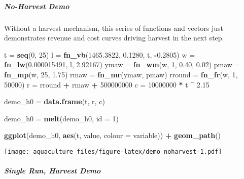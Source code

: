 \documentclass[]{article}
\newenvironment{Shaded}{\begin{snugshade}}{\end{snugshade}}
\newcommand{\KeywordTok}[1]{\textcolor[rgb]{0.13,0.29,0.53}{\textbf{#1}}}
\newcommand{\DataTypeTok}[1]{\textcolor[rgb]{0.13,0.29,0.53}{#1}}
\newcommand{\DecValTok}[1]{\textcolor[rgb]{0.00,0.00,0.81}{#1}}
\newcommand{\FloatTok}[1]{\textcolor[rgb]{0.00,0.00,0.81}{#1}}
\newcommand{\StringTok}[1]{\textcolor[rgb]{0.31,0.60,0.02}{#1}}
\newcommand{\OperatorTok}[1]{\textcolor[rgb]{0.81,0.36,0.00}{\textbf{#1}}}
\newcommand{\NormalTok}[1]{#1}
\let\oldsubparagraph\subparagraph
\renewcommand{\subparagraph}[1]{\oldsubparagraph{#1}\mbox{}}
\begin{document}
\subparagraph{No-Harvest Demo}\label{no-harvest-demo}

Without a harvest mechanism, this series of functions and vectors just
demonstrates revenue and cost curves driving harvest in the next step.

\begin{Shaded}
\begin{Highlighting}[]
\NormalTok{t =}\StringTok{ }\KeywordTok{seq}\NormalTok{(}\DecValTok{0}\NormalTok{, }\DecValTok{25}\NormalTok{)}
\NormalTok{l =}\StringTok{ }\KeywordTok{fn_vb}\NormalTok{(}\FloatTok{1465.3822}\NormalTok{, }\FloatTok{0.1280}\NormalTok{, t, }\OperatorTok{-}\FloatTok{0.2805}\NormalTok{)}
\NormalTok{w =}\StringTok{ }\KeywordTok{fn_lw}\NormalTok{(}\FloatTok{0.000015491}\NormalTok{, l, }\FloatTok{2.92167}\NormalTok{)}
\NormalTok{ymaw =}\StringTok{ }\KeywordTok{fn_wm}\NormalTok{(w, }\DecValTok{1}\NormalTok{, }\FloatTok{0.40}\NormalTok{, }\FloatTok{0.02}\NormalTok{)}
\NormalTok{pmaw =}\StringTok{ }\KeywordTok{fn_mp}\NormalTok{(w, }\DecValTok{25}\NormalTok{, }\FloatTok{1.75}\NormalTok{)}
\NormalTok{rmaw =}\StringTok{ }\KeywordTok{fn_mr}\NormalTok{(ymaw, pmaw)}
\NormalTok{rround =}\StringTok{ }\KeywordTok{fn_fr}\NormalTok{(w, }\DecValTok{1}\NormalTok{, }\DecValTok{50000}\NormalTok{)}
\NormalTok{r =}\StringTok{ }\NormalTok{rround }\OperatorTok{+}\StringTok{ }\NormalTok{rmaw }\OperatorTok{+}\StringTok{ }\DecValTok{500000000}
\NormalTok{c =}\StringTok{  }\DecValTok{10000000} \OperatorTok{*}\StringTok{ }\NormalTok{t }\OperatorTok{^}\StringTok{ }\FloatTok{2.15}

\NormalTok{demo_h0 =}\StringTok{ }\KeywordTok{data.frame}\NormalTok{(t, r, c)}

\NormalTok{demo_h0 =}\StringTok{ }\KeywordTok{melt}\NormalTok{(demo_h0, }\DataTypeTok{id =} \DecValTok{1}\NormalTok{)}

\KeywordTok{ggplot}\NormalTok{(demo_h0, }\KeywordTok{aes}\NormalTok{(t, value, }\DataTypeTok{colour =}\NormalTok{ variable)) }\OperatorTok{+}
\StringTok{  }\KeywordTok{geom_path}\NormalTok{()}
\end{Highlighting}
\end{Shaded}

\texttt{[image: aquaculture\_files/figure-latex/demo\_noharvest-1.pdf]}

\subparagraph{Single Run, Harvest Demo}\label{single-run-harvest-demo}
\end{document}
